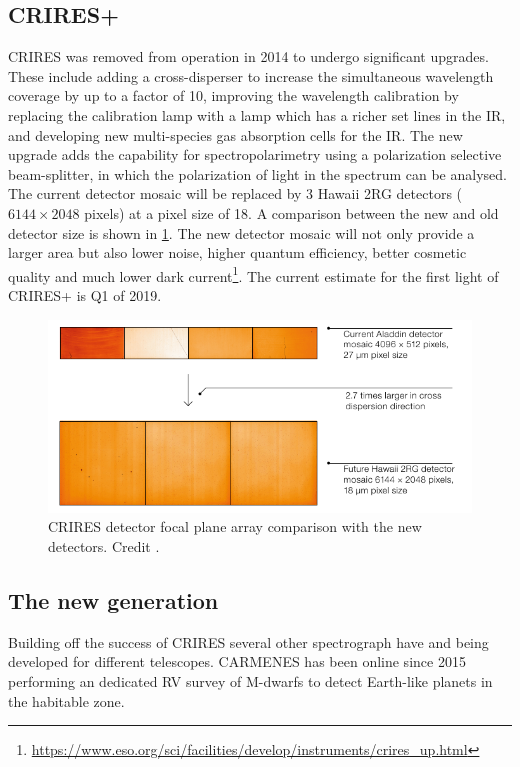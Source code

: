 \subsection{CRIRES+}
CRIRES was removed from operation in 2014 to undergo significant upgrades\citep{dorn_crires_2014}.
These include adding a cross-disperser to increase the simultaneous wavelength coverage by up to a factor of 10, improving the wavelength calibration by replacing the \thar{} calibration lamp with a \une{} lamp which has a richer set lines in the IR, and developing new multi-species gas absorption cells for the IR. 
The new upgrade adds the capability for spectropolarimetry using a polarization selective beam-splitter, in which the polarization of light in the spectrum can be analysed.
The current detector mosaic will be replaced by 3 Hawaii 2RG detectors (\(6144\times 2048\) pixels) at a pixel size of 18\um{}. A comparison between the new and old detector size is shown in \cref{fig:criresplus_detecotrs}. 
The new detector mosaic will not only provide a larger area but also lower noise, higher quantum efficiency, better cosmetic quality and much lower dark current\footnote{\href{https://www.eso.org/sci/facilities/develop/instruments/crires_up.html}{https://www.eso.org/sci/facilities/develop/instruments/crires_up.html}}.
The current estimate for the first light of CRIRES+ is Q1 of 2019.


\begin{figure}
    \centering
    \includegraphics[width=0.5\linewidth]{figures/advanced_material/criresplus_detectors.pdf}
    \caption{CRIRES detector focal plane array comparison with the new detectors.
    Credit \citep{dorn_crires_2014}.}
    \label{fig:criresplus_detecotrs}
\end{figure}

\subsection{The new generation}
\label{subsec:new_generation}
Building off the success of CRIRES several other \nir{} spectrograph have and being developed for different telescopes.
CARMENES has been online since 2015 performing an dedicated RV survey of M-dwarfs to detect Earth-like planets in the habitable zone. 


